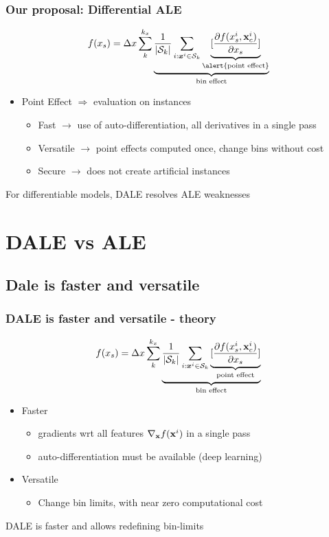 \begin{frame}
  \frametitle{Our proposal: Differential ALE}
  \begin{equation*}
    f(x_s) = \Delta x \sum_k^{k_x} \underbrace{\frac{1}{|\mathcal{S}_k|}
      \sum_{i:\xb^i \in \mathcal{S}_k} \underbrace{[\frac{\partial f(x_s^i, \Vx^i_c)}{\partial
            x_s}]}_{\text{\alert{point effect}}}}_{\text{bin effect}}
  \end{equation*}

  \begin{itemize}
  \item Point Effect \(\Rightarrow\) evaluation \alert{on instances}
    \begin{itemize}
    \item Fast \( \rightarrow \) use of auto-differentiation, all derivatives in a single pass
    \item Versatile \( \rightarrow\) point effects computed once, change bins without cost
    \item Secure \( \rightarrow\) does not create artificial instances
    \end{itemize}
  \end{itemize}

  For \alert{differentiable} models, DALE resolves ALE weaknesses
\end{frame}



\section{DALE vs ALE}

\subsection{Dale is faster and versatile}

\begin{frame}
  \frametitle{DALE is faster and versatile - theory}
  \[f(x_s) = \Delta x \sum_k^{k_x} \underbrace{\frac{1}{|\mathcal{S}_k|} \sum_{i:\boldsymbol{x}^i \in \mathcal{S}_k} \underbrace{[\frac{\partial f(x_s^i, \mathbf{x}^i_c)}{\partial x_s}]}_{\text{point effect}}}_{\text{bin effect}} \]

  \begin{itemize}
  \item Faster
    \begin{itemize}
    \item gradients wrt all features \(\nabla_{\mathbf{x}} f(\mathbf{x}^i)\) in a single pass
    \item auto-differentiation must be available (deep learning)
    \end{itemize}
  \item Versatile
    \begin{itemize}
    \item Change bin limits, with near zero computational cost
    \end{itemize}

  \end{itemize}
  DALE is faster and allows redefining bin-limits
\end{frame}

